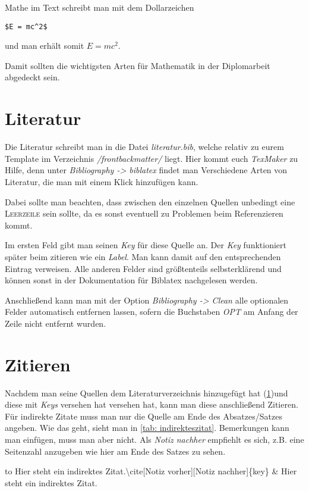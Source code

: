 Mathe im Text schreibt man mit dem Dollarzeichen
\begin{lstlisting}
$E = mc^2$
\end{lstlisting}
und man erhält somit $E=mc^2$.

Damit sollten die wichtigsten Arten für Mathematik in der Diplomarbeit abgedeckt sein.
%
%
\section{Literatur}%
\label{sec: literatur}
Die Literatur schreibt man in die Datei \emph{literatur.bib}, welche relativ zu eurem Template im Verzeichnis \emph{/frontbackmatter/} liegt. Hier kommt euch \emph{TexMaker} zu Hilfe, denn unter \emph{Bibliography -> biblatex} findet man Verschiedene Arten von Literatur, die man mit einem Klick hinzufügen kann.%

Dabei sollte man beachten, dass zwischen den einzelnen Quellen unbedingt eine \textsc{Leerzeile} sein sollte, da es sonst eventuell zu Problemen beim Referenzieren kommt.%

Im ersten Feld gibt man seinen \emph{Key} für diese Quelle an. Der \emph{Key} funktioniert später beim zitieren wie ein \emph{Label}. Man kann damit auf den entsprechenden Eintrag verweisen. Alle anderen Felder sind größtenteils selbsterklärend und können sonst in der Dokumentation für Biblatex nachgelesen werden.%

Anschließend kann man mit der Option \emph{Bibliography -> Clean} alle optionalen Felder automatisch entfernen lassen, sofern die Buchstaben \emph{OPT} am Anfang der Zeile nicht entfernt wurden.%
%
%
\section{Zitieren}%
\label{sec: zitieren}
Nachdem man seine Quellen dem Literaturverzeichnis hinzugefügt hat (\ref{sec: literatur})und diese mit \emph{Keys} versehen hat versehen hat, kann man diese anschließend Zitieren.%
Für indirekte Zitate muss man nur die Quelle am Ende des Absatzes/Satzes angeben. Wie das geht, sieht man in \ref{tab: indirekteszitat}. Bemerkungen kann man einfügen, muss man aber nicht. Als \emph{Notiz nachher} empfiehlt es sich, z.B. eine Seitenzahl anzugeben wie hier am Ende des Satzes zu sehen. \cite[][S.22 ff]{einstein}
\begin{table}[h]%
\begin{tabu} to \textwidth {X[c]X[c]}%
\toprule%
Hier steht ein indirektes Zitat.\textbackslash cite[Notiz vorher][Notiz nachher]\{key\} & Hier steht ein indirektes Zitat.\cite[Notiz vorher][Notiz nachher]{einstein}\\%
\bottomrule%
\end{tabu}%
\caption{Indirektes Zitat}%
\label{tab: indirekteszitat}%
\end{table}%

